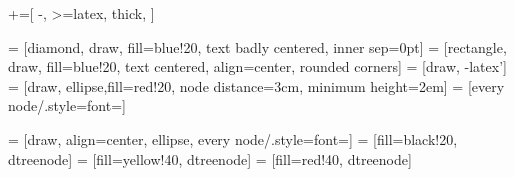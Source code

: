\usepackage{tikz}
\usepackage{pgfplots}
\usetikzlibrary{arrows, positioning, er, fit, backgrounds,calc,shapes,decorations.pathreplacing}
+=[
	-,
	>=latex, 
	thick,
]



 = [diamond, draw, fill=blue!20, text badly centered, inner sep=0pt]
 = [rectangle, draw, fill=blue!20, text centered, align=center, rounded corners]
 = [draw, -latex']
 = [draw, ellipse,fill=red!20, node distance=3cm, minimum height=2em]
 = [every node/.style={font=\scriptsize}]

 = [draw, align=center, ellipse, every node/.style={font=\scriptsize}]
 = [fill=black!20, dtreenode]
 = [fill=yellow!40, dtreenode]
 = [fill=red!40, dtreenode]

